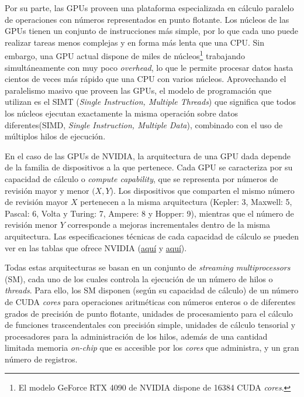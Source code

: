 Por su parte, las GPUs proveen una plataforma especializada en cálculo paralelo de operaciones con números representados en punto flotante. Los núcleos de las GPUs tienen un conjunto de instrucciones más simple, por lo que cada uno puede realizar tareas menos complejas y en forma más lenta que una CPU. Sin embargo, una GPU actual dispone de miles de núcleos\footnote{El modelo GeForce RTX 4090 de NVIDIA dispone de \num{16384} CUDA \textit{cores}.} trabajando simultáneamente con muy poco \textit{overhead}, lo que le permite procesar datos hasta cientos de veces más rápido que una CPU con varios núcleos. Aprovechando el paralelismo masivo que proveen las GPUs, el modelo de programación que utilizan es el SIMT (\textit{Single Instruction, Multiple Threads}) que significa que todos los núcleos ejecutan exactamente la misma operación sobre datos diferentes(SIMD, \textit{Single Instruction, Multiple Data}), combinado con el uso de múltiplos hilos de ejecución. %

En el caso de las GPUs de NVIDIA, la arquitectura de una GPU dada depende de la familia de dispositivos a la que pertenece. Cada GPU se caracteriza por su capacidad de cálculo o \textit{compute capability}, que se representa por números de revisión mayor y menor $(X, Y$). Los dispositivos que comparten el mismo número de revisión mayor $X$ pertenecen a la misma arquitectura (Kepler: 3, Maxwell: 5, Pascal: 6, Volta y Turing: 7, Ampere: 8 y Hopper: 9), mientras que el número de revisión menor $Y$ corresponde a mejoras incrementales dentro de la misma arquitectura. Las especificaciones técnicas de cada capacidad de cálculo se pueden ver en las tablas que ofrece NVIDIA (\href{https://docs.nvidia.com/cuda/cuda-c-programming-guide/index.html#features-and-technical-specifications-feature-support-per-compute-capability}{aquí} y \href{https://docs.nvidia.com/cuda/cuda-c-programming-guide/index.html#features-and-technical-specifications-technical-specifications-per-compute-capability}{aquí}).

Todas estas arquitecturas se basan en un conjunto de \textit{streaming multiprocessors} (SM), cada uno de los cuales controla la ejecución de un número de hilos o \textit{threads}. Para ello, los SM disponen (según su capacidad de cálculo) de un número de CUDA \textit{cores} para operaciones aritméticas con números enteros o de diferentes grados de precisión de punto flotante, unidades de procesamiento para el cálculo de funciones trascendentales con precisión simple, unidades de cálculo tensorial y procesadores para la administración de los hilos, además de una cantidad limitada memoria \textit{on-chip} que es accesible por los \textit{cores} que administra, y un gran número de registros.

